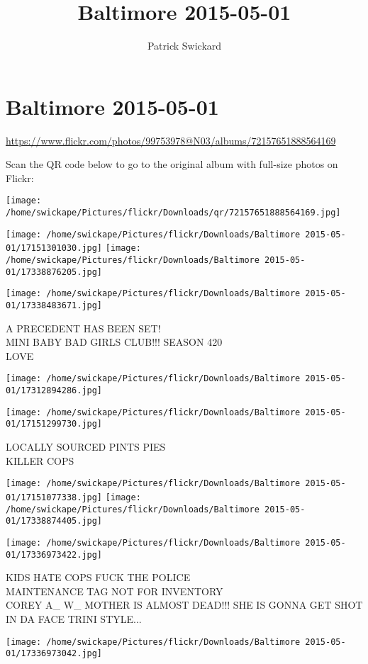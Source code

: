 \documentclass[10pt,letterpaper]{article}
\title{Baltimore 2015-05-01}
\author{Patrick Swickard}
\date{}
\begin{document}
\section*{Baltimore 2015-05-01}

\url{https://www.flickr.com/photos/99753978@N03/albums/72157651888564169}

Scan the QR code below to go to the original album with full-size photos on Flickr:

\texttt{[image: /home/swickape/Pictures/flickr/Downloads/qr/72157651888564169.jpg]}
\pagebreak

\texttt{[image: /home/swickape/Pictures/flickr/Downloads/Baltimore 2015-05-01/17151301030.jpg]}
\texttt{[image: /home/swickape/Pictures/flickr/Downloads/Baltimore 2015-05-01/17338876205.jpg]}

\texttt{[image: /home/swickape/Pictures/flickr/Downloads/Baltimore 2015-05-01/17338483671.jpg]}

A PRECEDENT HAS BEEN SET!\\
MINI BABY BAD GIRLS CLUB!!! SEASON 420\\
LOVE
\pagebreak

\texttt{[image: /home/swickape/Pictures/flickr/Downloads/Baltimore 2015-05-01/17312894286.jpg]}

\vspace{0.25in}
\texttt{[image: /home/swickape/Pictures/flickr/Downloads/Baltimore 2015-05-01/17151299730.jpg]}

LOCALLY SOURCED PINTS PIES\\
KILLER COPS
\pagebreak

\texttt{[image: /home/swickape/Pictures/flickr/Downloads/Baltimore 2015-05-01/17151077338.jpg]}
\texttt{[image: /home/swickape/Pictures/flickr/Downloads/Baltimore 2015-05-01/17338874405.jpg]}

\vspace{0.25in}
\texttt{[image: /home/swickape/Pictures/flickr/Downloads/Baltimore 2015-05-01/17336973422.jpg]}

KIDS HATE COPS FUCK THE POLICE\\
MAINTENANCE TAG NOT FOR INVENTORY\\
COREY A\_ W\_ MOTHER IS ALMOST DEAD!!!  SHE IS GONNA GET SHOT IN DA FACE TRINI STYLE...
\pagebreak

\texttt{[image: /home/swickape/Pictures/flickr/Downloads/Baltimore 2015-05-01/17336973042.jpg]}
\end{document}

